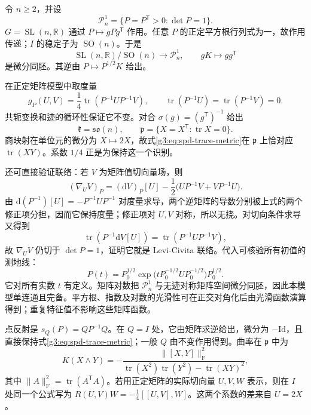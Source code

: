 \begin{example}\label{g3:ex:sl-symmetric-positive-matrices}
	令 \(n\ge2\)，并设
	\[
		\mathcal P_n^1=\{P=P^{\mathsf T}>0:\det P=1\}.
	\]
	\(G=\operatorname{SL}(n,\mathbb R)\) 通过 \(P\mapsto gPg^{\mathsf T}\) 作用。任意 \(P\) 的正定平方根行列式为一，故作用传递；\(I\) 的稳定子为 \(\operatorname{SO}(n)\)。于是
	\begin{equation}\label{g3:eq:sl-spd-identification}
		\operatorname{SL}(n,\mathbb R)/\operatorname{SO}(n)
		\longrightarrow\mathcal P_n^1,
		\qquad gK\longmapsto gg^{\mathsf T}
	\end{equation}
	是微分同胚。其逆由 \(P\mapsto P^{1/2}K\) 给出。

	在正定矩阵模型中取度量
	\begin{equation}\label{g3:eq:spd-trace-metric}
		g_P(U,V)=\frac14\operatorname{tr}(P^{-1}UP^{-1}V),
		\qquad \operatorname{tr}(P^{-1}U)=\operatorname{tr}(P^{-1}V)=0.
	\end{equation}
	共轭变换和迹的循环性保证它不变。对合 \(\sigma(g)=(g^{\mathsf T})^{-1}\) 给出
	\[
		\mathfrak k=\mathfrak{so}(n),\qquad
		\mathfrak p=\{X=X^{\mathsf T}:\operatorname{tr}X=0\}.
	\]
	商映射在单位元的微分为 \(X\mapsto2X\)，故式\eqref{g3:eq:spd-trace-metric}在 \(\mathfrak p\) 上恰对应 \(\operatorname{tr}(XY)\)。系数 \(1/4\) 正是为保持这一个识别。

	还可直接验证联络：若 \(V\) 为矩阵值切向量场，则
	\begin{equation}\label{g3:eq:spd-connection}
		(\nabla_UV)_P=(\mathrm dV)_P[U]
		-\frac12\bigl(UP^{-1}V+VP^{-1}U\bigr).
	\end{equation}
	由 \(\mathrm d(P^{-1})[U]=-P^{-1}UP^{-1}\) 对度量求导，两个逆矩阵的导数分别被上式的两个修正项分担，因而它保持度量；修正项对 \(U,V\) 对称，所以无挠。对切向条件求导又得到
	\[
		\operatorname{tr}(P^{-1}\mathrm dV[U])
		=\operatorname{tr}(P^{-1}UP^{-1}V),
	\]
	故 \(\nabla_UV\) 仍切于 \(\det P=1\)，证明它就是 Levi-Civita 联络。代入可核验所有初值的测地线：
	\begin{equation}\label{g3:eq:spd-geodesic}
		P(t)=P_0^{1/2}\exp\bigl(tP_0^{-1/2}UP_0^{-1/2}\bigr)P_0^{1/2}.
	\end{equation}
	它对所有实数 \(t\) 有定义。矩阵对数把 \(\mathcal P_n^1\) 与无迹对称矩阵空间微分同胚，因此本模型单连通且完备。平方根、指数及对数的光滑性可在正交对角化后由光滑函数演算得到；重复特征值不影响这些矩阵函数。

	点反射是 \(s_Q(P)=QP^{-1}Q\)。在 \(Q=I\) 处，它由矩阵求逆给出，微分为 \(-\mathrm{Id}\)，且直接保持式\eqref{g3:eq:spd-trace-metric}；一般 \(Q\) 由不变作用得到。曲率在 \(\mathfrak p\) 中为
	\begin{equation}\label{g3:eq:sl-trace-sectional}
		K(X\wedge Y)
		=-\frac{\lVert[X,Y]\rVert_{\mathrm F}^2}
		{\operatorname{tr}(X^2)\operatorname{tr}(Y^2)-\operatorname{tr}(XY)^2},
	\end{equation}
	其中 \(\lVert A\rVert_{\mathrm F}^2=\operatorname{tr}(A^{\mathsf T}A)\)。若用正定矩阵的实际切向量 \(U,V,W\) 表示，则在 \(I\) 处同一个公式写为 \(R(U,V)W=-\tfrac14[[U,V],W]\)。这两个系数的差来自 \(U=2X\)。


\end{example}
